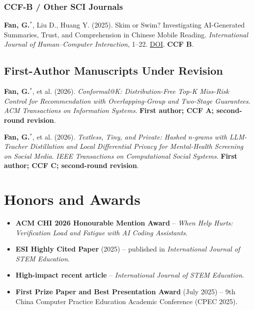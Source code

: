 \documentclass[a4paper,10pt]{article}
\newcommand{\pubitem}[1]{\item #1}
\begin{document}
\subsubsection*{CCF-B / Other SCI Journals}
\begin{enumerate}[label=\textbf{[J\arabic*]},resume]
  \pubitem{\textbf{Fan, G.}$^{*}$, Liu D., Huang Y. (2025). Skim or Swim? Investigating AI-Generated Summaries, Trust, and Comprehension in Chinese Mobile Reading. \textit{International Journal of Human--Computer Interaction}, 1--22. \href{https://doi.org/10.1080/10447318.2025.2574513}{DOI}. \textbf{CCF B}.}
\end{enumerate}

\subsection*{First-Author Manuscripts Under Revision}
\begin{enumerate}[label=\textbf{[R\arabic*]}]
  \pubitem{\textbf{Fan, G.}$^{*}$, et al. (2026). \textit{Conformal@K: Distribution-Free Top-K Miss-Risk Control for Recommendation with Overlapping-Group and Two-Stage Guarantees}. \textit{ACM Transactions on Information Systems}. \textbf{First author; CCF A; second-round revision}.}

  \pubitem{\textbf{Fan, G.}$^{*}$, et al. (2026). \textit{Textless, Tiny, and Private: Hashed n-grams with LLM-Teacher Distillation and Local Differential Privacy for Mental-Health Screening on Social Media}. \textit{IEEE Transactions on Computational Social Systems}. \textbf{First author; CCF C; second-round revision}.}
\end{enumerate}

\section*{Honors and Awards}
\begin{itemize}
  \item \textbf{ACM CHI 2026 Honourable Mention Award} -- \textit{When Help Hurts: Verification Load and Fatigue with AI Coding Assistants}.
  \item \textbf{ESI Highly Cited Paper} (2025) -- published in \textit{International Journal of STEM Education}.
  \item \textbf{High-impact recent article} -- \textit{International Journal of STEM Education}.
  \item \textbf{First Prize Paper and Best Presentation Award} (July 2025) -- 9th China Computer Practice Education Academic Conference (CPEC 2025).
\end{itemize}
\end{document}
